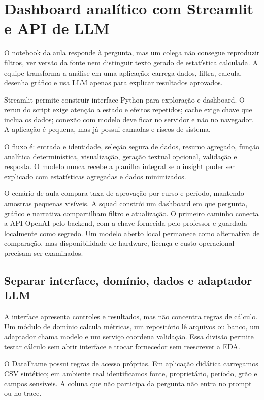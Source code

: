 \chapter{Dashboard analítico com Streamlit e API de LLM}

O notebook da aula responde à pergunta, mas um colega não consegue reproduzir filtros, ver versão da fonte nem distinguir texto gerado de estatística calculada. A equipe transforma a análise em uma aplicação: carrega dados, filtra, calcula, desenha gráfico e usa LLM apenas para explicar resultados aprovados.

Streamlit permite construir interface Python para exploração e dashboard. O rerun do script exige atenção a estado e efeitos repetidos; cache exige chave que inclua os dados; conexão com modelo deve ficar no servidor e não no navegador. A aplicação é pequena, mas já possui camadas e riscos de sistema.

O fluxo é: entrada e identidade, seleção segura de dados, resumo agregado, função analítica determinística, visualização, geração textual opcional, validação e resposta. O modelo nunca recebe a planilha integral se o insight puder ser explicado com estatísticas agregadas e dados minimizados.

O cenário de aula compara taxa de aprovação por curso e período, mantendo amostras pequenas visíveis. A squad constrói um dashboard em que pergunta, gráfico e narrativa compartilham filtro e atualização. O primeiro caminho conecta a API OpenAI pelo backend, com a chave fornecida pelo professor e guardada localmente como segredo. Um modelo aberto local permanece como alternativa de comparação, mas disponibilidade de hardware, licença e custo operacional precisam ser examinados.

\section{Separar interface, domínio, dados e adaptador LLM}

A interface apresenta controles e resultados, mas não concentra regras de cálculo. Um módulo de domínio calcula métricas, um repositório lê arquivos ou banco, um adaptador chama modelo e um serviço coordena validação. Essa divisão permite testar cálculo sem abrir interface e trocar fornecedor sem reescrever a EDA.

O DataFrame possui regras de acesso próprias. Em aplicação didática carregamos CSV sintético; em ambiente real identificamos fonte, proprietário, período, grão e campos sensíveis. A coluna que não participa da pergunta não entra no prompt ou no trace.

